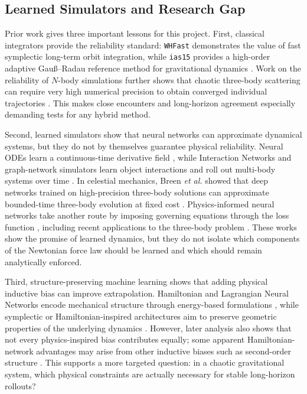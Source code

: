\documentclass[12pt]{article}
\begin{document}
\subsection{Learned Simulators and Research Gap}

Prior work gives three important lessons for this project. First, classical integrators
provide the reliability standard: \texttt{WHFast} demonstrates the value of fast
symplectic long-term orbit integration, while \texttt{ias15} provides a high-order
adaptive Gau\ss--Radau reference method for gravitational dynamics
\cite{Rein_2015,Rein_2014}. Work on the reliability of $N$-body simulations further
shows that chaotic three-body scattering can require very high numerical precision to
obtain converged individual trajectories \cite{boekholt2015reliability}. This makes
close encounters and long-horizon agreement especially demanding tests for any hybrid
method.

Second, learned simulators show that neural networks can approximate dynamical systems,
but they do not by themselves guarantee physical reliability. Neural ODEs learn a
continuous-time derivative field \cite{chen2018neuralode}, while Interaction Networks
and graph-network simulators learn object interactions and roll out multi-body systems
over time \cite{battaglia2016interaction,sanchez2020learning}. In celestial mechanics,
Breen \emph{et al.} showed that deep networks trained on high-precision three-body
solutions can approximate bounded-time three-body evolution at fixed cost
\cite{breen2020newton}. Physics-informed neural networks take another route by imposing
governing equations through the loss function \cite{cuomo2022scientific}, including
recent applications to the three-body problem \cite{pereira2025advancing}. These works
show the promise of learned dynamics, but they do not isolate which components of the
Newtonian force law should be learned and which should remain analytically enforced.

Third, structure-preserving machine learning shows that adding physical inductive bias
can improve extrapolation. Hamiltonian and Lagrangian Neural Networks encode mechanical
structure through energy-based formulations \cite{greydanus2019hamiltonian,cranmer2020lagrangian},
while symplectic or Hamiltonian-inspired architectures aim to preserve geometric
properties of the underlying dynamics \cite{zhong2020symoden,jin2020sympnets,tong2021symplectic,david2023symplectic,horn2025generalized}. However, later analysis also shows that
not every physics-inspired bias contributes equally; some apparent Hamiltonian-network
advantages may arise from other inductive biases such as second-order structure
\cite{gruver2022deconstructing}. This supports a more targeted question: in a chaotic
gravitational system, which physical constraints are actually necessary for stable
long-horizon rollouts?
\end{document}
